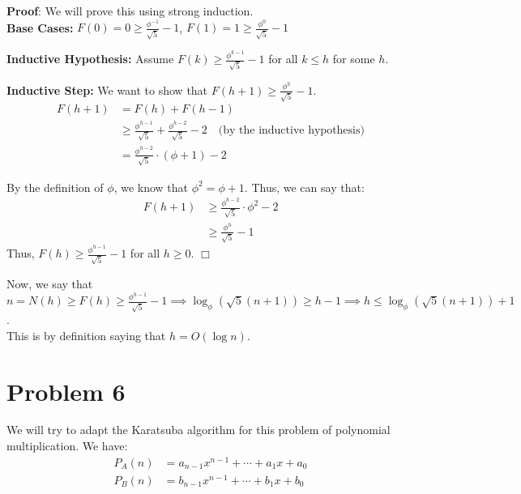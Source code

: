 \documentclass[a4paper]{article}
\def\endproofmark{$\Box$}
\newenvironment{proof}{\par{\bf Proof}:}{\endproofmark\smallskip}
\begin{document}
\begin{proof}
    We will prove this using strong induction. \\

    \textbf{Base Cases:} 
    $F(0) = 0 \ge \frac{\phi^{-1}}{\sqrt{5}} - 1$, $F(1) = 1 \ge \frac{\phi^{0}}{\sqrt{5}} - 1$

    \textbf{Inductive Hypothesis:} Assume $F(k) \ge \frac{\phi^{k-1}}{\sqrt{5}} - 1$ for all $k \leq h$ for some $h$.

    \textbf{Inductive Step:} We want to show that $F(h+1) \geq \frac{\phi^{h}}{\sqrt{5}} - 1$.
    \begin{align*}
        F(h+1) &= F(h) + F(h-1) \\
        &\geq \frac{\phi^{h-1}}{\sqrt{5}} + \frac{\phi^{h-2}}{\sqrt{5}} - 2 \quad \text{(by the inductive hypothesis)} \\
        &= \frac{\phi^{h-2}}{\sqrt{5}} \cdot (\phi + 1) - 2
    \end{align*}

    \noindent By the definition of $\phi$, we know that $\phi^2 = \phi + 1$. Thus, we can say that:
    \begin{align*}
        F(h+1) &\geq \frac{\phi^{h-2}}{\sqrt{5}} \cdot \phi^2 - 2 \\
        &\geq \frac{\phi^{h}}{\sqrt{5}} - 1
    \end{align*}
    Thus, $F(h) \geq \frac{\phi^{h-1}}{\sqrt{5}} - 1$ for all $h \geq 0$.
\end{proof}

\vspace{0.5em}
\noindent Now, we say that $n = N(h) \geq F(h) \geq \frac{\phi^{h-1}}{\sqrt{5}} - 1 \implies \log_{\phi} {\left(\sqrt{5} (n + 1)\right)} \geq h - 1 \implies h \leq \log_{\phi} {\left(\sqrt{5} (n + 1)\right)} + 1$. \\

\noindent This is by definition saying that $h = O(\log n)$. \\


\newpage
\section*{Problem 6}
We will try to adapt the Karatsuba algorithm for this problem of polynomial multiplication. We have:
\begin{align*}
    P_A(n) &= a_{n-1}x^{n-1} + \cdots + a_1x + a_0 \\
    P_B(n) &= b_{n-1}x^{n-1} + \cdots + b_1x + b_0
\end{align*}
\end{document}
